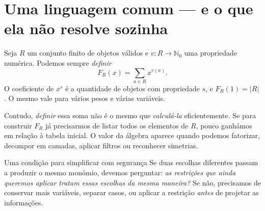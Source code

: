 \documentclass[11pt,a4paper,oneside]{book}
\newcommand{\Nzero}{\mathbb{N}_0}
\newcommand{\card}[1]{\lvert #1\rvert}
\begin{document}
\chapter{Uma linguagem comum --- e o que ela não resolve sozinha}
Seja $R$ um conjunto finito de objetos válidos e $v:R\to\Nzero$ uma propriedade numérica. Podemos sempre \emph{definir}
\[
F_R(x)=\sum_{a\in R}x^{v(a)}.
\]
O coeficiente de $x^s$ é a quantidade de objetos com propriedade $s$, e $F_R(1)=\card R$. O mesmo vale para vários pesos e várias variáveis.

Contudo, \emph{definir} essa soma não é o mesmo que \emph{calculá-la} eficientemente. Se para construir $F_R$ já precisarmos de listar todos os elementos de $R$, pouco ganhámos em relação à tabela inicial. O valor da álgebra aparece quando podemos fatorizar, decompor em camadas, aplicar filtros ou reconhecer simetrias.
\begin{center}
\end{center}
\begin{observacaobox}{Uma condição para simplificar com segurança}
Se duas escolhas diferentes passam a produzir o mesmo monómio, devemos perguntar: \emph{as restrições que ainda queremos aplicar tratam essas escolhas da mesma maneira?} Se não, precisamos de conservar mais variáveis, separar casos, ou aplicar a restrição \emph{antes} de projetar as informações.
\end{observacaobox}
\end{document}

